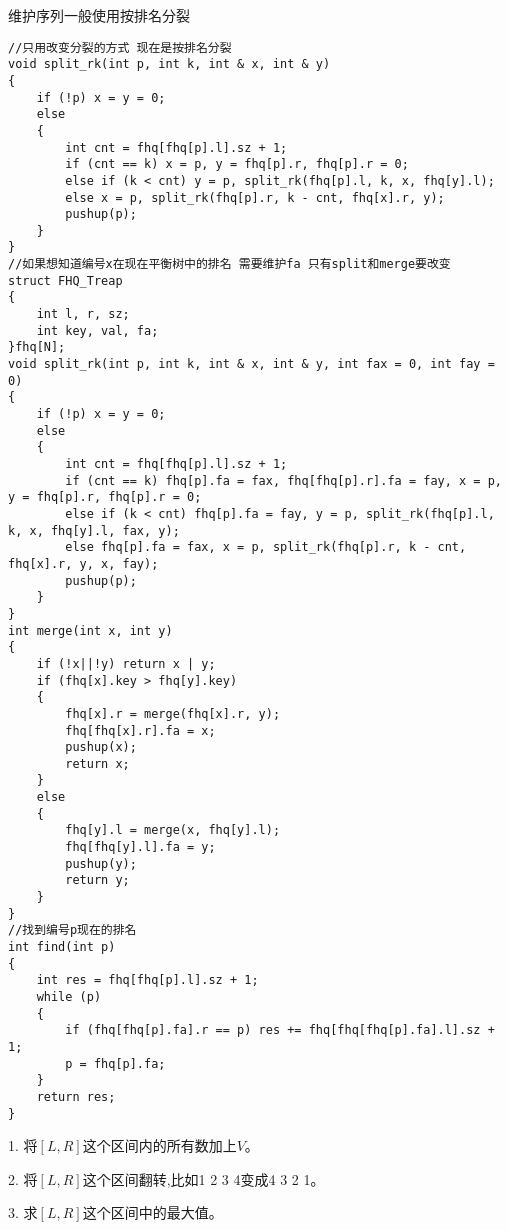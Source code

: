 \documentclass[a4paper, fontset=none]{ctexart}
\begin{document}
维护序列一般使用按排名分裂

\begin{verbatim}
//只用改变分裂的方式 现在是按排名分裂
void split_rk(int p, int k, int & x, int & y)
{
    if (!p) x = y = 0;
    else
    {
        int cnt = fhq[fhq[p].l].sz + 1;
        if (cnt == k) x = p, y = fhq[p].r, fhq[p].r = 0;
        else if (k < cnt) y = p, split_rk(fhq[p].l, k, x, fhq[y].l);
        else x = p, split_rk(fhq[p].r, k - cnt, fhq[x].r, y);
        pushup(p);
    }
}
//如果想知道编号x在现在平衡树中的排名 需要维护fa 只有split和merge要改变
struct FHQ_Treap
{
    int l, r, sz;
    int key, val, fa;
}fhq[N];
void split_rk(int p, int k, int & x, int & y, int fax = 0, int fay = 0)
{
    if (!p) x = y = 0;
    else
    {
        int cnt = fhq[fhq[p].l].sz + 1;
        if (cnt == k) fhq[p].fa = fax, fhq[fhq[p].r].fa = fay, x = p, y = fhq[p].r, fhq[p].r = 0;
        else if (k < cnt) fhq[p].fa = fay, y = p, split_rk(fhq[p].l, k, x, fhq[y].l, fax, y);
        else fhq[p].fa = fax, x = p, split_rk(fhq[p].r, k - cnt, fhq[x].r, y, x, fay);
        pushup(p);
    }
}
int merge(int x, int y)
{
    if (!x||!y) return x | y;
    if (fhq[x].key > fhq[y].key)
    {
        fhq[x].r = merge(fhq[x].r, y);
        fhq[fhq[x].r].fa = x;
        pushup(x);
        return x;
    }
    else
    {
        fhq[y].l = merge(x, fhq[y].l);
        fhq[fhq[y].l].fa = y;
        pushup(y);
        return y;
    }
}
//找到编号p现在的排名
int find(int p)
{
    int res = fhq[fhq[p].l].sz + 1;
    while (p)
    {
        if (fhq[fhq[p].fa].r == p) res += fhq[fhq[fhq[p].fa].l].sz + 1;
        p = fhq[p].fa;
    }
    return res;
}
\end{verbatim}

1. 将$[L, R]$这个区间内的所有数加上$V$。

2. 将$[L, R]$这个区间翻转,比如1 2 3 4变成4 3 2 1。

3. 求$[L, R]$这个区间中的最大值。
\end{document}
